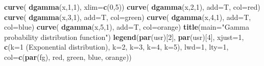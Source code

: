 \documentclass[
]{book}
\newenvironment{Shaded}{\begin{snugshade}}{\end{snugshade}}
\newcommand{\DataTypeTok}[1]{\textcolor[rgb]{0.13,0.29,0.53}{#1}}
\newcommand{\DecValTok}[1]{\textcolor[rgb]{0.00,0.00,0.81}{#1}}
\newcommand{\KeywordTok}[1]{\textcolor[rgb]{0.13,0.29,0.53}{\textbf{#1}}}
\newcommand{\NormalTok}[1]{#1}
\newcommand{\StringTok}[1]{\textcolor[rgb]{0.31,0.60,0.02}{#1}}
\begin{document}
\begin{Shaded}
\begin{Highlighting}[]
\KeywordTok{curve}\NormalTok{( }\KeywordTok{dgamma}\NormalTok{(x,}\DecValTok{1}\NormalTok{,}\DecValTok{1}\NormalTok{), }\DataTypeTok{xlim=}\KeywordTok{c}\NormalTok{(}\DecValTok{0}\NormalTok{,}\DecValTok{5}\NormalTok{))}
\KeywordTok{curve}\NormalTok{( }\KeywordTok{dgamma}\NormalTok{(x,}\DecValTok{2}\NormalTok{,}\DecValTok{1}\NormalTok{), }\DataTypeTok{add=}\NormalTok{T, }\DataTypeTok{col=}\StringTok{\textquotesingle{}red\textquotesingle{}}\NormalTok{)}
\KeywordTok{curve}\NormalTok{( }\KeywordTok{dgamma}\NormalTok{(x,}\DecValTok{3}\NormalTok{,}\DecValTok{1}\NormalTok{), }\DataTypeTok{add=}\NormalTok{T, }\DataTypeTok{col=}\StringTok{\textquotesingle{}green\textquotesingle{}}\NormalTok{)}
\KeywordTok{curve}\NormalTok{( }\KeywordTok{dgamma}\NormalTok{(x,}\DecValTok{4}\NormalTok{,}\DecValTok{1}\NormalTok{), }\DataTypeTok{add=}\NormalTok{T, }\DataTypeTok{col=}\StringTok{\textquotesingle{}blue\textquotesingle{}}\NormalTok{)}
\KeywordTok{curve}\NormalTok{( }\KeywordTok{dgamma}\NormalTok{(x,}\DecValTok{5}\NormalTok{,}\DecValTok{1}\NormalTok{), }\DataTypeTok{add=}\NormalTok{T, }\DataTypeTok{col=}\StringTok{\textquotesingle{}orange\textquotesingle{}}\NormalTok{)}
\KeywordTok{title}\NormalTok{(}\DataTypeTok{main=}\StringTok{"Gamma probability distribution function"}\NormalTok{)}
\KeywordTok{legend}\NormalTok{(}\KeywordTok{par}\NormalTok{(}\StringTok{\textquotesingle{}usr\textquotesingle{}}\NormalTok{)[}\DecValTok{2}\NormalTok{], }\KeywordTok{par}\NormalTok{(}\StringTok{\textquotesingle{}usr\textquotesingle{}}\NormalTok{)[}\DecValTok{4}\NormalTok{], }\DataTypeTok{xjust=}\DecValTok{1}\NormalTok{,}
       \KeywordTok{c}\NormalTok{(}\StringTok{\textquotesingle{}k=1 (Exponential distribution)\textquotesingle{}}\NormalTok{, }\StringTok{\textquotesingle{}k=2\textquotesingle{}}\NormalTok{, }
         \StringTok{\textquotesingle{}k=3\textquotesingle{}}\NormalTok{, }\StringTok{\textquotesingle{}k=4\textquotesingle{}}\NormalTok{, }\StringTok{\textquotesingle{}k=5\textquotesingle{}}\NormalTok{),}
       \DataTypeTok{lwd=}\DecValTok{1}\NormalTok{, }\DataTypeTok{lty=}\DecValTok{1}\NormalTok{,}
       \DataTypeTok{col=}\KeywordTok{c}\NormalTok{(}\KeywordTok{par}\NormalTok{(}\StringTok{\textquotesingle{}fg\textquotesingle{}}\NormalTok{), }\StringTok{\textquotesingle{}red\textquotesingle{}}\NormalTok{, }\StringTok{\textquotesingle{}green\textquotesingle{}}\NormalTok{, }\StringTok{\textquotesingle{}blue\textquotesingle{}}\NormalTok{, }\StringTok{\textquotesingle{}orange\textquotesingle{}}\NormalTok{))}
\end{Highlighting}
\end{Shaded}
\end{document}
